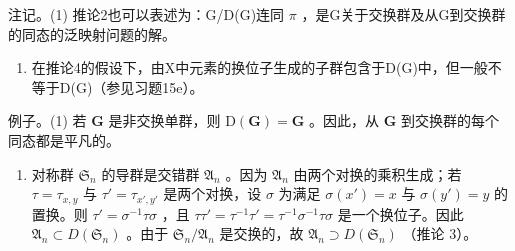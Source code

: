 注记。(1) 推论2也可以表述为：G/D(G)连同 \(\pi\) ，是G关于交换群及从G到交换群的同态的泛映射问题的解。

\begin{enumerate}
\def\labelenumi{(\arabic{enumi})}
\setcounter{enumi}{1}
\tightlist
\item
  在推论4的假设下，由X中元素的换位子生成的子群包含于D(G)中，但一般不等于D(G)（参见习题15e）。
\end{enumerate}

例子。(1) 若 \(\mathbf{G}\) 是非交换单群，则 \(\mathrm{D}(\mathbf{G}) = \mathbf{G}\) 。因此，从 \(\mathbf{G}\) 到交换群的每个同态都是平凡的。

\begin{enumerate}
\def\labelenumi{(\arabic{enumi})}
\setcounter{enumi}{1}
\tightlist
\item
  对称群 \(\mathfrak{S}_n\) 的导群是交错群 \(\mathfrak{A}_n\) 。因为 \(\mathfrak{A}_n\) 由两个对换的乘积生成；若 \(\tau = \tau_{x,y}\) 与 \(\tau' = \tau_{x',y'}\) 是两个对换，设 \(\sigma\) 为满足 \(\sigma(x') = x\) 与 \(\sigma(y') = y\) 的置换。则 \(\tau' = \sigma^{-1}\tau\sigma\) ，且 \(\tau\tau' = \tau^{-1}\tau' = \tau^{-1}\sigma^{-1}\tau\sigma\) 是一个换位子。因此 \(\mathfrak{A}_n \subset D(\mathfrak{S}_n)\) 。由于 \(\mathfrak{S}_n / \mathfrak{A}_n\) 是交换的，故 \(\mathfrak{A}_n \supset D(\mathfrak{S}_n)\) （推论 3）。
\end{enumerate}

